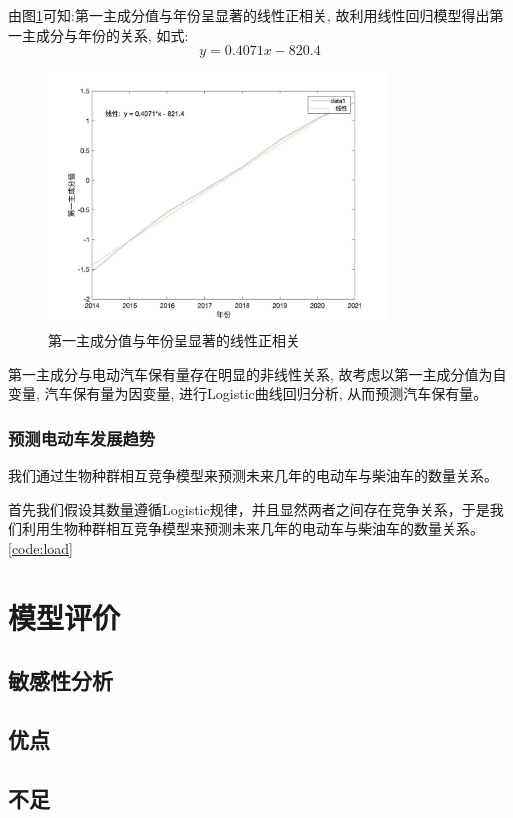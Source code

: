 \documentclass[12pt, a4paper, oneside]{ctexart}
\begin{document}
由图\ref{fig:第一主成分值}可知:第一主成分值与年份呈显著的线性正相关, 故利用线性回归模型得出第一主成分与年份的关系, 如式:
\begin{dmath}
    y=0.4071x-820.4
\end{dmath}
\begin{figure}[h]
    \centering
    \includegraphics[width=0.8\textwidth]{pic/第一主成分值.jpg}
    \caption{第一主成分值与年份呈显著的线性正相关}
    \label{fig:第一主成分值}
\end{figure}

第一主成分与电动汽车保有量存在明显的非线性关系, 故考虑以第一主成分值为自变量, 汽车保有量为因变量, 进行Logistic曲线回归分析, 从而预测汽车保有量。

\subsubsection{预测电动车发展趋势}
我们通过生物种群相互竞争模型来预测未来几年的电动车与柴油车的数量关系。

首先我们假设其数量遵循Logistic规律，并且显然两者之间存在竞争关系，于是我们利用生物种群相互竞争模型来预测未来几年的电动车与柴油车的数量关系。\ref{code:load}



\section{模型评价}
\subsection{敏感性分析}
\subsection{优点}
\subsection{不足}
\end{document}
